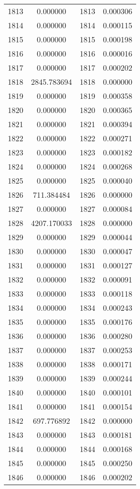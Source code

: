 \documentclass[12pt]{article}
\begin{document}
\begin{longtable}{@{}cccc@{}}
1813 & 0.000000 & 1813 & 0.000306 \\
1814 & 0.000000 & 1814 & 0.000115 \\
1815 & 0.000000 & 1815 & 0.000198 \\
1816 & 0.000000 & 1816 & 0.000016 \\
1817 & 0.000000 & 1817 & 0.000202 \\
1818 & 2845.783694 & 1818 & 0.000000 \\
1819 & 0.000000 & 1819 & 0.000358 \\
1820 & 0.000000 & 1820 & 0.000365 \\
1821 & 0.000000 & 1821 & 0.000394 \\
1822 & 0.000000 & 1822 & 0.000271 \\
1823 & 0.000000 & 1823 & 0.000182 \\
1824 & 0.000000 & 1824 & 0.000268 \\
1825 & 0.000000 & 1825 & 0.000040 \\
1826 & 711.384484 & 1826 & 0.000000 \\
1827 & 0.000000 & 1827 & 0.000084 \\
1828 & 4207.170033 & 1828 & 0.000000 \\
1829 & 0.000000 & 1829 & 0.000044 \\
1830 & 0.000000 & 1830 & 0.000047 \\
1831 & 0.000000 & 1831 & 0.000127 \\
1832 & 0.000000 & 1832 & 0.000091 \\
1833 & 0.000000 & 1833 & 0.000118 \\
1834 & 0.000000 & 1834 & 0.000243 \\
1835 & 0.000000 & 1835 & 0.000176 \\
1836 & 0.000000 & 1836 & 0.000280 \\
1837 & 0.000000 & 1837 & 0.000253 \\
1838 & 0.000000 & 1838 & 0.000171 \\
1839 & 0.000000 & 1839 & 0.000244 \\
1840 & 0.000000 & 1840 & 0.000101 \\
1841 & 0.000000 & 1841 & 0.000154 \\
1842 & 697.776892 & 1842 & 0.000000 \\
1843 & 0.000000 & 1843 & 0.000181 \\
1844 & 0.000000 & 1844 & 0.000168 \\
1845 & 0.000000 & 1845 & 0.000250 \\
1846 & 0.000000 & 1846 & 0.000202 \\

\end{longtable}
\end{document}
